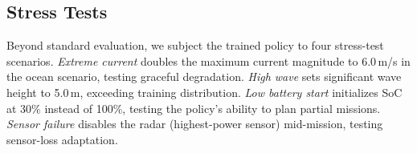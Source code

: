 \documentclass[conference]{IEEEtran}
\begin{document}
\subsection{Stress Tests}

Beyond standard evaluation, we subject the trained policy to four stress-test scenarios. \textit{Extreme current} doubles the maximum current magnitude to 6.0\,m/s in the ocean scenario, testing graceful degradation. \textit{High wave} sets significant wave height to 5.0\,m, exceeding training distribution. \textit{Low battery start} initializes SoC at 30\% instead of 100\%, testing the policy's ability to plan partial missions. \textit{Sensor failure} disables the radar (highest-power sensor) mid-mission, testing sensor-loss adaptation.


\end{document}

